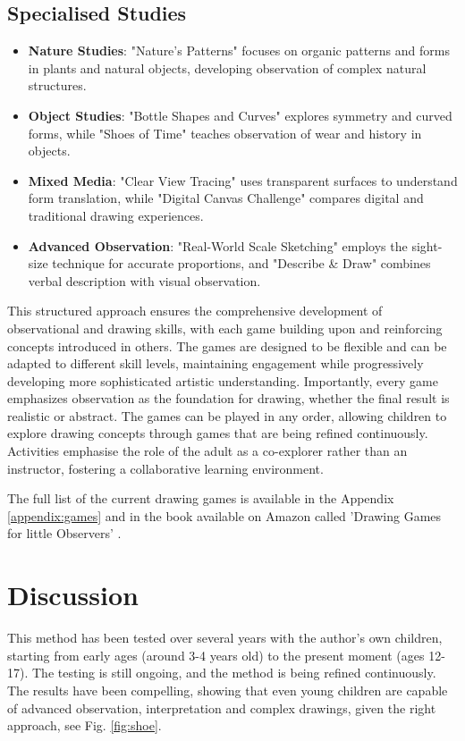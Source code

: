 \documentclass{article}
\begin{document}
\subsection{Specialised Studies}
\begin{itemize}
    \item \textbf{Nature Studies}: "Nature's Patterns" focuses on organic patterns and forms in plants and natural objects, developing observation of complex natural structures.
    \item \textbf{Object Studies}: "Bottle Shapes and Curves" explores symmetry and curved forms, while "Shoes of Time" teaches observation of wear and history in objects.
    \item \textbf{Mixed Media}: "Clear View Tracing" uses transparent surfaces to understand form translation, while "Digital Canvas Challenge" compares digital and traditional drawing experiences.
    \item \textbf{Advanced Observation}: "Real-World Scale Sketching" employs the sight-size technique for accurate proportions, and "Describe \& Draw" combines verbal description with visual observation.
\end{itemize}

This structured approach ensures the comprehensive development of observational and drawing skills, with each game building upon and reinforcing concepts introduced in others. The games are designed to be flexible and can be adapted to different skill levels, maintaining engagement while progressively developing more sophisticated artistic understanding. Importantly, every game emphasizes observation as the foundation for drawing, whether the final result is realistic or abstract. The games can be played in any order, allowing children to explore drawing concepts through games that are being refined continuously. Activities emphasise the role of the adult as a co-explorer rather than an instructor, fostering a collaborative learning environment.

The full list of the current drawing games is available in the Appendix \ref{appendix:games} and in the book available on Amazon called 'Drawing Games for little Observers' \cite{salimbeni2024drawing}.


\section{Discussion}

This method has been tested over several years with the author’s own children, starting from early ages (around 3-4 years old) to the present moment (ages 12-17). The testing is still ongoing, and the method is being refined continuously. The results have been compelling, showing that even young children are capable of advanced observation, interpretation and complex drawings, given the right approach, see Fig.  \ref{fig:shoe}.
\end{document}
